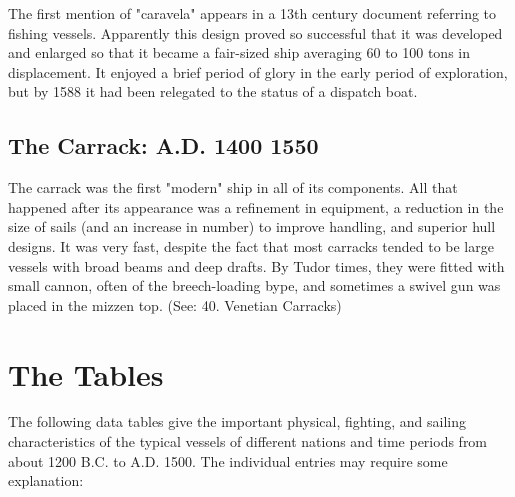 \documentclass{article}
\begin{document}
\begin{multicols}{3}
The first mention of "caravela" appears in a 13th century document
referring to fishing vessels.  Apparently this design proved so
successful that it was developed and enlarged so that it became a
fair-sized ship averaging 60 to 100 tons in displacement.  It enjoyed
a brief period of glory in the early period of exploration, but by
1588 it had been relegated to the status of a dispatch boat.

\subsection{The Carrack:  A.D. 1400    1550}

The carrack was the first "modern" ship in all of its components. All
that happened after its appearance was a refinement in equipment, a
reduction in the size of sails (and an increase in number) to improve
handling, and superior hull designs.  It was very fast, despite the
fact that most carracks tended to be large vessels with broad beams
and deep drafts.  By Tudor times, they were fitted with small cannon,
often of the breech-loading bype, and sometimes a swivel gun was
placed in the mizzen top.  (See: 40.  Venetian Carracks)

\end{multicols}

\section{The Tables}

The following data tables give the important physical, fighting, and
sailing characteristics of the typical vessels of different nations
and time periods from about 1200 B.C. to A.D. 1500.  The individual
entries may require some explanation:
\end{document}
